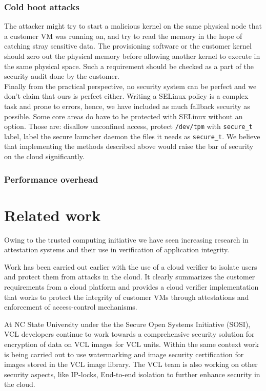 \documentclass[10pt,twocolumn,pdftex]{article}
\begin{document}
\subsubsection{Cold boot attacks}
The attacker might try to start a malicious kernel on the same physical node that a customer VM was running on, and try to read the memory in the hope of catching stray sensitive data. The provisioning software or the customer kernel should zero out the physical memory before allowing another kernel to execute in the same physical space. Such a requirement should be checked as a part of the security audit done by the customer. 
\\

Finally from the practical perspective, no security system can be perfect and we don't claim that ours is perfect either. Writing a SELinux policy is a complex task and prone to errors, hence, we have included as much fallback security as possible. Some core areas do have to be protected with SELinux without an option. Those are: disallow unconfined access, protect {\tt /dev/tpm} with {\tt secure\_t} label, label the secure launcher daemon the files it needs as {\tt secure\_t}. We believe that implementing the methods described above would raise the bar of security on the cloud significantly.

\subsubsection{Performance overhead}

\section{Related work}
Owing to the trusted computing initiative we have seen increasing research in attestation systems \cite{springerlink:10.1007/s10207-011-0124-7} and their use in verification of application integrity. 

Work has been carried out earlier with the use of a cloud verifier \cite{seeding-clouds-with-trust-anchors} to isolate users and protect them from attacks in the cloud. It clearly summarizes the customer requirements from a cloud platform and provides a cloud verifier implementation that works to protect the integrity of customer VMs through attestations and enforcement of access-control mechanisms. 

At NC State University under the the Secure Open Systems Initiative (SOSI), VCL developers continue to work \cite{5429056} towards a comprehensive security solution for encryption of data on VCL images for VCL units. Within the same context work is being carried out to use watermarking and image security certification for images stored in the VCL image library. The VCL team is also working on other security aspects, like IP-locks, End-to-end isolation to further enhance security in the cloud.
\end{document}
